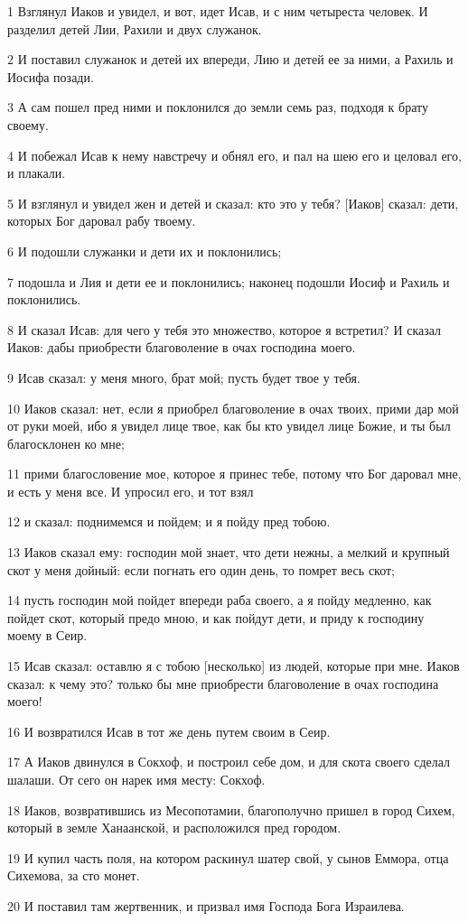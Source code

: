 \par 1 Взглянул Иаков и увидел, и вот, идет Исав, и с ним четыреста человек. И разделил детей Лии, Рахили и двух служанок.
\par 2 И поставил служанок и детей их впереди, Лию и детей ее за ними, а Рахиль и Иосифа позади.
\par 3 А сам пошел пред ними и поклонился до земли семь раз, подходя к брату своему.
\par 4 И побежал Исав к нему навстречу и обнял его, и пал на шею его и целовал его, и плакали.
\par 5 И взглянул и увидел жен и детей и сказал: кто это у тебя? [Иаков] сказал: дети, которых Бог даровал рабу твоему.
\par 6 И подошли служанки и дети их и поклонились;
\par 7 подошла и Лия и дети ее и поклонились; наконец подошли Иосиф и Рахиль и поклонились.
\par 8 И сказал Исав: для чего у тебя это множество, которое я встретил? И сказал Иаков: дабы приобрести благоволение в очах господина моего.
\par 9 Исав сказал: у меня много, брат мой; пусть будет твое у тебя.
\par 10 Иаков сказал: нет, если я приобрел благоволение в очах твоих, прими дар мой от руки моей, ибо я увидел лице твое, как бы кто увидел лице Божие, и ты был благосклонен ко мне;
\par 11 прими благословение мое, которое я принес тебе, потому что Бог даровал мне, и есть у меня все. И упросил его, и тот взял
\par 12 и сказал: поднимемся и пойдем; и я пойду пред тобою.
\par 13 Иаков сказал ему: господин мой знает, что дети нежны, а мелкий и крупный скот у меня дойный: если погнать его один день, то помрет весь скот;
\par 14 пусть господин мой пойдет впереди раба своего, а я пойду медленно, как пойдет скот, который предо мною, и как пойдут дети, и приду к господину моему в Сеир.
\par 15 Исав сказал: оставлю я с тобою [несколько] из людей, которые при мне. Иаков сказал: к чему это? только бы мне приобрести благоволение в очах господина моего!
\par 16 И возвратился Исав в тот же день путем своим в Сеир.
\par 17 А Иаков двинулся в Сокхоф, и построил себе дом, и для скота своего сделал шалаши. От сего он нарек имя месту: Сокхоф.
\par 18 Иаков, возвратившись из Месопотамии, благополучно пришел в город Сихем, который в земле Ханаанской, и расположился пред городом.
\par 19 И купил часть поля, на котором раскинул шатер свой, у сынов Еммора, отца Сихемова, за сто монет.
\par 20 И поставил там жертвенник, и призвал имя Господа Бога Израилева.

